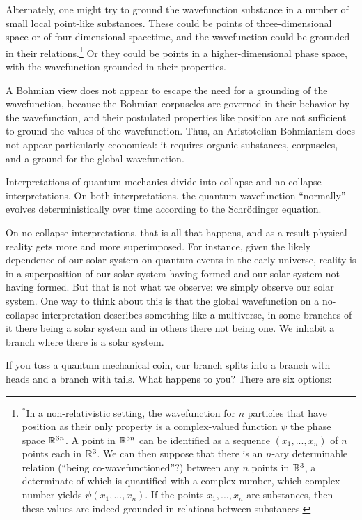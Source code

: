 Alternately, one might try to ground the wavefunction substance in a number of small local point-like substances.
These could be points of three-dimensional space or of four-dimensional spacetime, and the wavefunction could be 
grounded in their relations.\footnote{$^*$In a non-relativistic setting, the wavefunction for $n$ particles that 
have position as their only property is a complex-valued function $\psi$ the phase space $\mathbb R^{3n}$. A point in $\mathbb R^{3n}$ can 
be identified as a sequence $(x_1,...,x_n)$ of $n$ points each in $\mathbb R^3$. We can then suppose that there is an 
$n$-ary determinable relation (``being co-wavefunctioned''?) between any $n$ points in $\mathbb R^3$, a determinate of which is 
quantified with a complex number, which complex number yields $\psi(x_1,...,x_n)$. If the points $x_1,...,x_n$ are 
substances, then these values are indeed grounded in relations between substances.} Or they could be points in a higher-dimensional
phase space, with the wavefunction grounded in their properties. 

A Bohmian view does not appear to escape the need for a grounding of the wavefunction, because the Bohmian corpuscles are 
governed in their behavior by the wavefunction, and their postulated properties like position are not sufficient to ground the values of the wavefunction. Thus, an Aristotelian Bohmianism does not appear particularly economical: it requires organic
substances, corpuscles, and a ground for the global wavefunction.

Interpretations of quantum mechanics divide into collapse and no-collapse interpretations. On both interpretations,
the quantum wavefunction ``normally'' evolves deterministically over time according to the Schr\"{o}dinger equation.

On no-collapse interpretations, that is all that happens, and as a result physical reality gets more and more 
superimposed. For instance, given the likely dependence of our solar system on quantum events in the early universe,
reality is in a superposition of our solar system having formed and our solar system not having formed. But that is 
not what we observe: we simply observe our solar system. One way to think about this is that the global wavefunction 
on a no-collapse interpretation describes something like a multiverse, in some branches of it there being a solar system and 
in others there not being one. We inhabit a branch where there is a solar system. 

If you toss a quantum mechanical coin, our branch splits into a branch with heads and a branch with tails. What happens
to you? There are six options:

